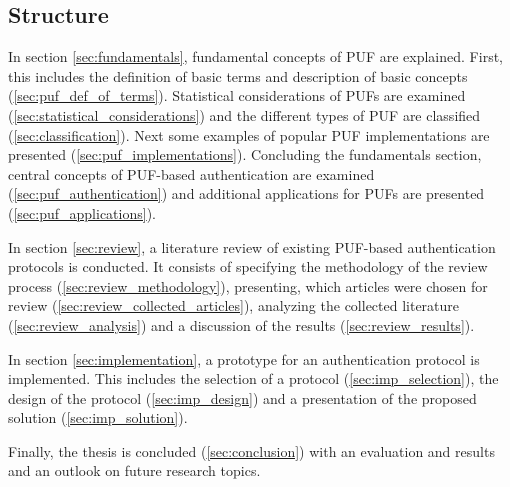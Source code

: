 \subsection{Structure}
\label{sec:structure}

In section \ref{sec:fundamentals}, fundamental concepts of \ac{PUF} are explained.
First, this includes the definition of basic terms and description of basic concepts (\ref{sec:puf_def_of_terms}).
Statistical considerations of PUFs are examined (\ref{sec:statistical_considerations}) and the different types
of PUF are classified (\ref{sec:classification}). Next some examples of popular PUF implementations
are presented (\ref{sec:puf_implementations}). Concluding the fundamentals section,
central concepts of PUF-based authentication are examined (\ref{sec:puf_authentication}) and additional
applications for PUFs are presented (\ref{sec:puf_applications}).

In section \ref{sec:review}, a literature review of existing PUF-based authentication protocols is conducted.
It consists of specifying the methodology of the review process (\ref{sec:review_methodology}), presenting, which articles were chosen
for review (\ref{sec:review_collected_articles}), analyzing the collected literature (\ref{sec:review_analysis}) and a discussion of the results (\ref{sec:review_results}).

In section \ref{sec:implementation}, a prototype for an authentication protocol is implemented.
This includes the selection of a protocol (\ref{sec:imp_selection}), the design of the protocol (\ref{sec:imp_design}) and a presentation of
the proposed solution (\ref{sec:imp_solution}).

Finally, the thesis is concluded (\ref{sec:conclusion}) with an evaluation and results and an outlook on future research topics.